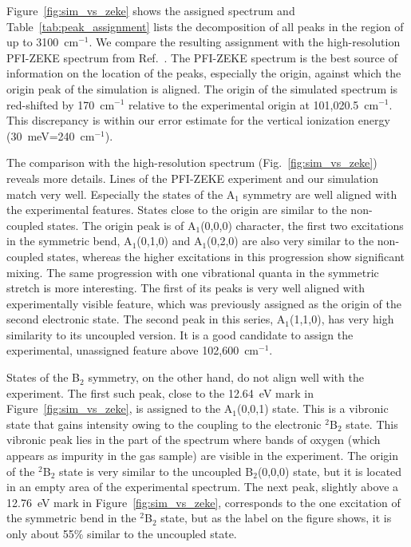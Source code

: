 \documentclass[12pt,prb,aps]{revtex4}
\begin{document}
Figure~\ref{fig:sim_vs_zeke}
shows the assigned spectrum and Table~\ref{tab:peak_assignment} lists the
decomposition of all peaks in the region of up to 3100~cm$^{-1}$. 
We compare the resulting assignment with the high-resolution
PFI-ZEKE spectrum from
Ref.~. The PFI-ZEKE spectrum is the best source of
information on the location of the peaks, especially the origin, against which
the origin peak of the simulation is aligned. The origin of the simulated
spectrum is red-shifted by 170~cm$^{-1}$ relative to the experimental origin at 101,020.5~cm$^{-1}$.\cite{Willitsch:O3ZEKE:2005} This discrepancy is within
our error estimate for the vertical ionization energy
(30~meV=240~cm$^{-1}$).  

The comparison with the high-resolution spectrum (Fig.~\ref{fig:sim_vs_zeke}) reveals more details. Lines of the PFI-ZEKE
experiment and our simulation match very well. Especially the states of the
A$_1$ symmetry are well aligned with the experimental features. States close
to the origin are similar to the non-coupled states. The origin peak is of
A$_1$(0,0,0) character, the first two excitations in the symmetric bend,
A$_1$(0,1,0) and A$_1$(0,2,0) are also very similar to the non-coupled states,
whereas the higher excitations in this progression show significant mixing. The
same progression with one vibrational quanta in the symmetric stretch is more
interesting. The first of its peaks is very well aligned with experimentally
visible feature, which was previously assigned as the origin of the second
electronic state. The second peak in this series, A$_1$(1,1,0), has very high
similarity to its uncoupled version. It is a good candidate to assign the
experimental, unassigned feature above 102,600~cm$^{-1}$.

States of the B$_2$ symmetry, on the other hand, do not align well with
the experiment. The first such peak, close to the 12.64~eV mark in
Figure~\ref{fig:sim_vs_zeke}, is assigned to the A$_1$(0,0,1) state.  This is
a vibronic state that gains intensity owing to the coupling to the electronic
$^2$B$_2$ state. This vibronic peak lies in the part of the spectrum where
bands of oxygen (which appears as impurity in the gas sample) are visible in
the experiment. The origin of the $^2$B$_2$ state is very similar to the
uncoupled B$_2$(0,0,0) state, but it is located in an empty area of the
experimental spectrum. The next peak, slightly above a 12.76~eV mark in
Figure~\ref{fig:sim_vs_zeke}, corresponds to the one excitation of the
symmetric bend in the $^2$B$_2$ state, but as the label on the figure shows,
it is only about 55\% similar to the uncoupled state.
\end{document}
